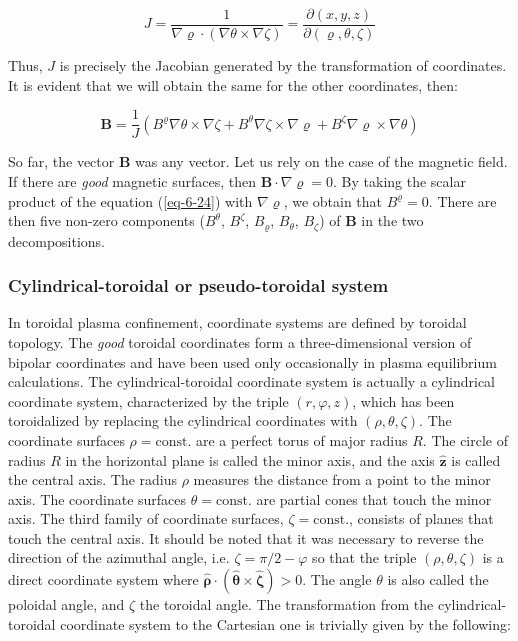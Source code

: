 \begin{equation}
    \label{eq-6-23}
    J=\frac{1}{\nabla\varrho\cdot(\nabla\theta\times\nabla\zeta)}=\frac{\partial(x, y, z)}{\partial(\varrho, \theta, \zeta)}
\end{equation}

Thus, $J$ is precisely the Jacobian generated by the transformation of coordinates. It is evident that we will obtain the same for the other coordinates, then:

\begin{equation}
    \label{eq-6-24}
    \mathbf{B}=\frac{1}{J}\left(B^\varrho\nabla\theta\times\nabla\zeta+B^\theta\nabla\zeta\times\nabla\varrho+B^\zeta\nabla\varrho\times\nabla\theta\right)
\end{equation}

So far, the vector $\mathbf{B}$ was any vector. Let us rely on the case of the magnetic field. If there are \textit{good} magnetic surfaces, then $\mathbf{B}\cdot\nabla\varrho=0$. By taking the scalar product of the equation (\ref{eq-6-24}) with $\nabla\varrho$, we obtain that $B^\varrho=0$. There are then five non-zero components ($B^\theta$, $B^\zeta$, $B_\varrho$, $B_\theta$, $B_\zeta$) of $\mathbf{B}$ in the two decompositions.

\subsubsection{Cylindrical-toroidal or pseudo-toroidal system}

In toroidal plasma confinement, coordinate systems are defined by toroidal topology. The \textit{good} toroidal coordinates form a three-dimensional version of bipolar coordinates and have been used only occasionally in plasma equilibrium calculations. The cylindrical-toroidal coordinate system is actually a cylindrical coordinate system, characterized by the triple $(r, \varphi, z)$, which has been toroidalized by replacing the cylindrical coordinates with $(\rho, \theta, \zeta)$. The coordinate surfaces $\rho=\text{const.}$ are a perfect torus of major radius $R$. The circle of radius $R$ in the horizontal plane is called the minor axis, and the axis $\mathbf{\hat{z}}$ is called the central axis. The radius $\rho$ measures the distance from a point to the minor axis. The coordinate surfaces $\theta=\text{const.}$ are partial cones that touch the minor axis. The third family of coordinate surfaces, $\zeta=\text{const.}$, consists of planes that touch the central axis. It should be noted that it was necessary to reverse the direction of the azimuthal angle, i.e. $\zeta=\pi/2-\varphi$ so that the triple $(\rho, \theta, \zeta)$ is a direct coordinate system where $\boldsymbol{\hat{\rho}}\cdot(\boldsymbol{\hat{\theta}}\times\boldsymbol{\hat{\zeta}})>0$. The angle $\theta$ is also called the poloidal angle, and $\zeta$ the toroidal angle. The transformation from the cylindrical-toroidal coordinate system to the Cartesian one is trivially given by the following:


